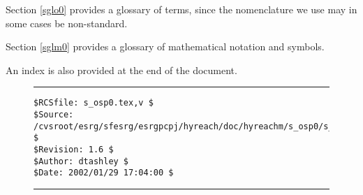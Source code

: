 Section \ref{sglo0} provides a glossary of terms, since the nomenclature we use
may in some cases be non-standard.

Section \ref{sglm0} provides a glossary of mathematical notation and symbols.

An index is also provided at the end of the document.


\noindent\begin{figure}[!b]
\noindent\rule[-0.25in]{\textwidth}{1pt}
\begin{tiny}
\begin{verbatim}
$RCSfile: s_osp0.tex,v $
$Source: /cvsroot/esrg/sfesrg/esrgpcpj/hyreach/doc/hyreachm/s_osp0/s_osp0.tex,v $
$Revision: 1.6 $
$Author: dtashley $
$Date: 2002/01/29 17:04:00 $
\end{verbatim}
\end{tiny}
\noindent\rule[0.25in]{\textwidth}{1pt}
\end{figure}
%
%
%
%
%
%
